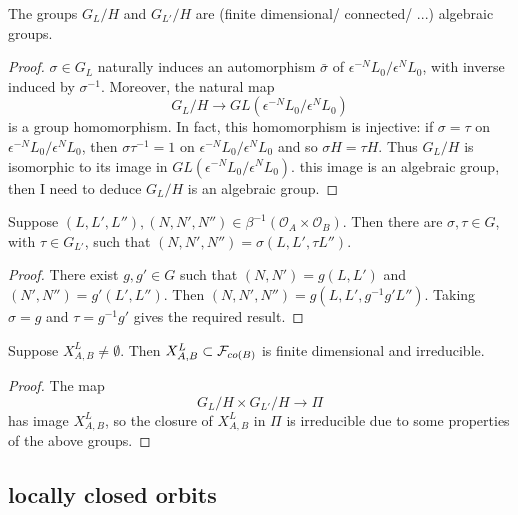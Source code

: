 \documentclass[a4paper, 11pt]{report}
\begin{document}
\begin{lemma}
The groups $G_L/H$ and $G_{L'}/H$ are (finite dimensional/ connected/ ...) algebraic groups.
\end{lemma}
\begin{proof}
$\sigma\in G_L$ naturally induces an automorphism $\bar{\sigma}$ of $\epsilon^{-N} L_0/{\epsilon^N L_0}$, with inverse induced by $\sigma^{-1}$. Moreover, the natural map
\begin{equation*}
G_L/H \to GL(\epsilon^{-N}L_0/{\epsilon^N L_0})
\end{equation*}
is a group homomorphism. In fact, this homomorphism is injective: if $\sigma = \tau$ on $\epsilon^{-N}L_0/{\epsilon^N L_0}$, then $\sigma\tau^{-1} = 1$ on $\epsilon^{-N}L_0/{\epsilon^N L_0}$ and so $\sigma H = \tau H$. Thus $G_L/H$ is isomorphic to its image in $GL(\epsilon^{-N}L_0/{\epsilon^N L_0})$. {\color{red}this image is an algebraic group, then I need to deduce $G_L/H$ is an algebraic group.} 
\end{proof}

\begin{lemma}
Suppose $(L,L',L''),(N,N',N'')\in\beta^{-1}(\mathcal{O}_A\times\mathcal{O}_B)$. Then there are $\sigma,\tau\in G$, with $\tau\in G_{L'}$, such that $(N,N',N'') = \sigma(L,L',\tau L'')$.
\end{lemma}
\begin{proof}
There exist $g,g'\in G$ such that $(N,N') = g(L,L')$ and $(N',N'') = g'(L',L'')$. Then $(N,N',N'') = g(L,L',g^{-1}g' L'')$. Taking $\sigma = g$ and $\tau = g^{-1}g'$ gives the required result.
\end{proof}

\begin{proposition}\label{lemma:irreducibility-orbit-product}
Suppose $X_{A,B}^L\neq\emptyset$. Then $X_{A,B}^L\subset\mathcal{F}_{co(B)}$ is finite dimensional and irreducible.
\end{proposition}
\begin{proof}
The map
\begin{equation*}
G_L/H\times G_{L'}/H\to\Pi
\end{equation*}
has image $X_{A,B}^L$, so the closure of $X_{A,B}^L$ in $\Pi$ is irreducible {\color{red}due to some properties of the above groups.}
\end{proof}

\subsection{locally closed orbits}
\end{document}
